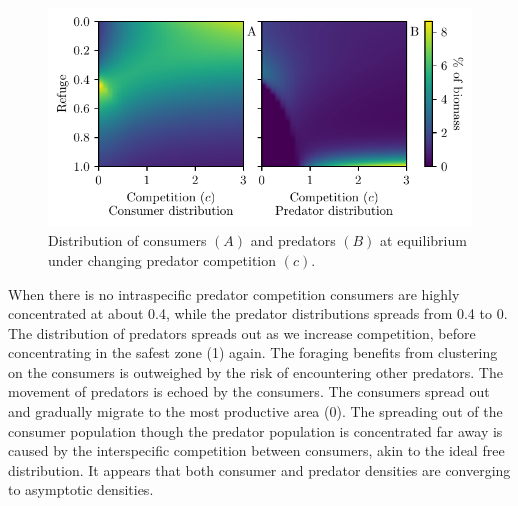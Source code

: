 
\begin{figure}[H]
  \caption{Distribution of consumers $(A)$ and predators $(B)$ at equilibrium under changing predator competition $(c)$.}
  \label{fig:strat_comp}
    \includegraphics{plots/increasing_competition_c.pdf}
\end{figure}

When there is no intraspecific predator competition consumers are highly concentrated at about 0.4, while the predator distributions spreads from 0.4 to 0. The distribution of predators spreads out as we increase competition, before concentrating in the safest zone (1) again. The foraging benefits from clustering on the consumers is outweighed by the risk of encountering other predators. The movement of predators is echoed by the consumers. The consumers spread out and gradually migrate to the most productive area (0). The spreading out of the consumer population though the predator population is concentrated far away is caused by the interspecific competition between consumers, akin to the ideal free distribution. It appears that both consumer and predator densities are converging to asymptotic densities. %

